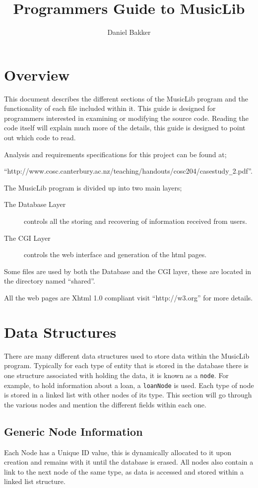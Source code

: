 \documentclass{article}
\title{Programmers Guide to MusicLib}
\author{Daniel Bakker}
\begin{document}
\maketitle
\newpage
\tableofcontents
\newpage
\section{Overview}
This document describes the different sections of the MusicLib program and the functionality of each file included within it. This guide is designed for programmers interested in examining or modifying the source code. Reading the code itself will explain much more of the details, this guide is designed to point out which code to read.

Analysis and requirements specifications for this project can be found at;

``http://www.cosc.canterbury.ac.nz/teaching/handouts/cosc204/casestudy\verb|_|2.pdf''.

The MusicLib program is divided up into two main layers;
\begin{description} 
\item[The Database Layer] controls all the storing and recovering of information received from users.
\item[The CGI Layer] controls the web interface and generation of the html pages.
\end{description}

Some files are used by both the Database and the CGI layer, these are located in the directory named ``shared''.

All the web pages are Xhtml 1.0 compliant visit ``http://w3.org'' for more details.
\section{Data Structures}
There are many different data structures used to store data within the MusicLib program. Typically for each type of entity that is stored in the database there is one structure associated with holding the data, it is known as a \verb|node|. For example, to hold information about a loan, a \verb|loanNode| is used.
Each type of node is stored in a linked list with other nodes of its type. This section will go through the various nodes and mention the different fields within each one.
\subsection{Generic Node Information}
Each Node has a Unique ID value, this is dynamically allocated to it upon creation and remains with it until the database is erased. All nodes  also contain a link to the next node of the same type, as data is accessed and stored within a linked list structure. 
\end{document}

